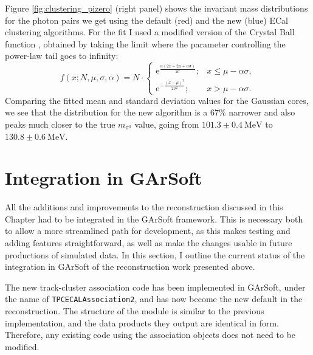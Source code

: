 Figure \ref{fig:clustering_pizero} (right panel) shows the invariant mass distributions for the photon pairs we get using the default (red) and the new (blue) ECal clustering algorithms. For the fit I used a modified version of the Crystal Ball function \cite{Gaiser1982}, obtained by taking the limit where the parameter controlling the power-law tail goes to infinity:
\begin{equation}
	f(x; N, \mu, \sigma, \alpha) = N \cdot
	\left\{
	\begin{array}{ll}
		\mathrm{e}^{\frac{\alpha(2x-2\mu+\alpha\sigma)}{2\sigma}};& x \leq \mu - \alpha\sigma,\\
		\mathrm{e}^{-\frac{(x-\mu)^{2}}{2\sigma^{2}}};& x > \mu - \alpha\sigma.
	\end{array}
	\right.
\end{equation}
Comparing the fitted mean and standard deviation values for the Gaussian cores, we see that the distribution for the new algorithm is a $67\%$ narrower and also peaks much closer to the true $m_{\pi^{0}}$ value, going from $101.3 \pm 0.4 \ \mathrm{MeV}$ to $130.8 \pm 0.6 \ \mathrm{MeV}$.

\section{Integration in GArSoft}\label{section:integration}

All the additions and improvements to the reconstruction discussed in this Chapter had to be integrated in the GArSoft framework. This is necessary both to allow a more streamlined path for development, as this makes testing and adding features straightforward, as well as make the changes usable in future productions of simulated data. In this section, I outline the current status of the integration in GArSoft of the reconstruction work presented above.

The new track-cluster association code has been implemented in GArSoft, under the name of \texttt{TPCECALAssociation2}, and has now become the new default in the reconstruction. The structure of the module is similar to the previous implementation, and the data products they output are identical in form. Therefore, any existing code using the association objects does not need to be modified.

